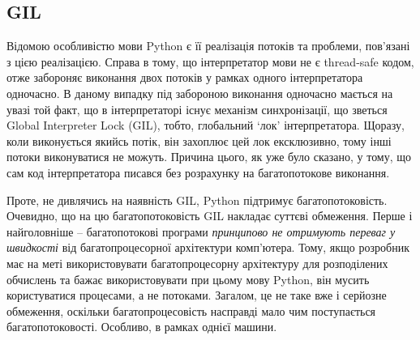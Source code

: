 \documentclass[a4paper, 12pt, onsedie]{article}
\begin{document}
\subsection{GIL}
    Відомою особливістю мови Python є її реалізація потоків та проблеми, пов'язані з цією
    реалізацією. Справа в тому, що інтерпретатор мови не є thread-safe кодом, отже забороняє
    виконання двох потоків у рамках одного інтерпретатора одночасно. В даному випадку під
    забороною виконання одночасно мається на увазі той факт, що в інтерпретаторі існує
    механізм синхронізації, що зветься Global Interpreter Lock (GIL), тобто, глобальний `лок'
    інтерпретатора. Щоразу, коли виконується якийсь потік, він захоплює цей лок ексклюзивно,
    тому інші потоки виконуватися не можуть. Причина цього, як уже було сказано, у тому, що
    сам код інтерпретатора писався без розрахунку на багатопотокове виконання. 

    Проте, не дивлячись на наявність GIL, Python підтримує багатопотоковість. Очевидно, що
    на цю багатопотоковість GIL накладає суттєві обмеження. Перше і найголовніше -- 
    багатопотокові програми \emph{принципово не отримують переваг у швидкості}
    від багатопроцесорної архітектури комп'ютера. Тому, якщо розробник має на меті 
    використовувати багатопроцесорну архітектуру для розподілених обчислень та бажає
    використовувати при цьому мову Python, він мусить користуватися процесами, а не потоками.
    Загалом, це не таке вже і серйозне обмеження, оскільки багатопроцесовість насправді мало
    чим поступається багатопотоковості. Особливо, в рамках однієї машини.
\end{document}
